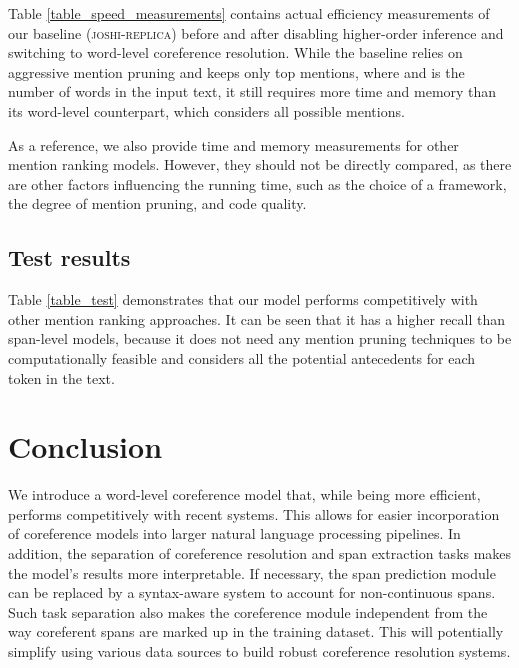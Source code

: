 \documentclass[11pt]{article}
\begin{document}
Table \ref{table_speed_measurements} contains actual efficiency measurements of our baseline (\textsc{joshi-replica}) before and after disabling higher-order inference and switching to word-level coreference resolution. While the baseline relies on aggressive mention pruning and keeps only top  mentions, where  and  is the number of words in the input text, it still requires more time and memory than its word-level counterpart, which considers all possible mentions.

As a reference, we also provide time and memory measurements for other mention ranking models. However, they should not be directly compared, as there are other factors influencing the running time, such as the choice of a framework, the degree of mention pruning, and code quality.

\subsection{Test results} Table \ref{table_test} demonstrates that our model performs competitively with other mention ranking approaches. It can be seen that it has a higher recall than span-level models, because it does not need any mention pruning techniques to be computationally feasible and considers all the potential antecedents for each token in the text.

\section{Conclusion}
We introduce a word-level coreference model that, while being more efficient, performs competitively with recent systems. This allows for easier incorporation of coreference models into larger natural language processing pipelines. In addition, the separation of coreference resolution and span extraction tasks makes the model's results more interpretable.
If necessary, the span prediction module can be replaced by a syntax-aware system to account for non-continuous spans.
Such task separation also makes the coreference module independent from the way coreferent spans are marked up in the training dataset. This will potentially simplify using various data sources to build robust coreference resolution systems.



\end{document}
